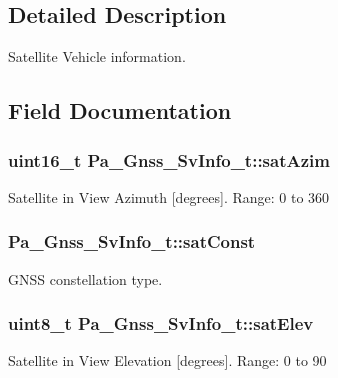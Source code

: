 \subsection{Detailed Description}
Satellite Vehicle information. 

\subsection{Field Documentation}
\subsubsection[{\texorpdfstring{sat\+Azim}{satAzim}}]{\setlength{\rightskip}{0pt plus 5cm}uint16\+\_\+t Pa\+\_\+\+Gnss\+\_\+\+Sv\+Info\+\_\+t\+::sat\+Azim}\hypertarget{struct_pa___gnss___sv_info__t_a6e9f58fd59caf4955ba0b27683d38f52}{}\label{struct_pa___gnss___sv_info__t_a6e9f58fd59caf4955ba0b27683d38f52}
Satellite in View Azimuth \mbox{[}degrees\mbox{]}. Range\+: 0 to 360 
\subsubsection[{\texorpdfstring{sat\+Const}{satConst}}]{ Pa\+\_\+\+Gnss\+\_\+\+Sv\+Info\+\_\+t\+::sat\+Const}\hypertarget{struct_pa___gnss___sv_info__t_a8f5881bb6dbcf7aeab1e190f0a4287b0}{}\label{struct_pa___gnss___sv_info__t_a8f5881bb6dbcf7aeab1e190f0a4287b0}


G\+N\+SS constellation type. 

\subsubsection[{\texorpdfstring{sat\+Elev}{satElev}}]{\setlength{\rightskip}{0pt plus 5cm}uint8\+\_\+t Pa\+\_\+\+Gnss\+\_\+\+Sv\+Info\+\_\+t\+::sat\+Elev}\hypertarget{struct_pa___gnss___sv_info__t_a6075b59d5abb744106c601290e7c3e10}{}\label{struct_pa___gnss___sv_info__t_a6075b59d5abb744106c601290e7c3e10}
Satellite in View Elevation \mbox{[}degrees\mbox{]}. Range\+: 0 to 90 
